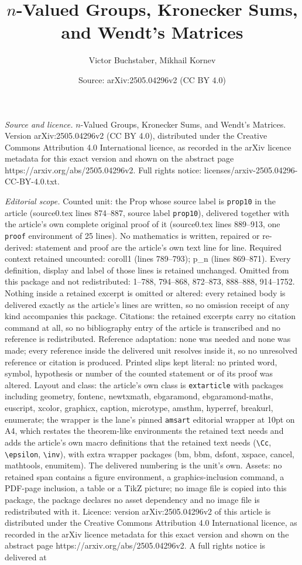 \documentclass[10pt,a4paper]{amsart}
\title[$n$-Valued Groups, Kronecker Sums, and Wendt's Matrices]{$n$-Valued Groups, Kronecker Sums, and Wendt's Matrices}
\author{Victor Buchstaber, Mikhail Kornev}
\date{Source: arXiv:2505.04296v2 (CC BY 4.0)}
\begin{document}
\maketitle

\noindent\emph{Source and licence.} $n$-Valued Groups, Kronecker Sums, and Wendt's Matrices. Version arXiv:2505.04296v2 (CC BY 4.0), distributed under the Creative Commons Attribution 4.0 International licence, as recorded in the arXiv licence metadata for this exact version and shown on the abstract page https://arxiv.org/abs/2505.04296v2. Full rights notice: licenses/arxiv-2505.04296-CC-BY-4.0.txt.\par\smallskip

\noindent\textit{Editorial scope.} Counted unit: the Prop whose source label is \texttt{prop10} in the article (source0.tex lines 874--887, source label \texttt{prop10}), delivered together with the article's own complete original proof of it (source0.tex lines 889--913, one \texttt{proof} environment of 25 lines). No mathematics is written, repaired or re-derived: statement and proof are the article's own text line for line. Required context retained uncounted: coroll1 (lines 789--793); p\_n (lines 869--871). Every definition, display and label of those lines is retained unchanged. Omitted from this package and not redistributed: 1--788, 794--868, 872--873, 888--888, 914--1752. Nothing inside a retained excerpt is omitted or altered: every retained body is delivered exactly as the article's lines are written, so no omission receipt of any kind accompanies this package. Citations: the retained excerpts carry no citation command at all, so no bibliography entry of the article is transcribed and no reference is redistributed. Reference adaptation: none was needed and none was made; every reference inside the delivered unit resolves inside it, so no unresolved reference or citation is produced. Printed slips kept literal: no printed word, symbol, hypothesis or number of the counted statement or of its proof was altered. Layout and class: the article's own class is \texttt{extarticle} with packages including geometry, fontenc, newtxmath, ebgaramond, ebgaramond-maths, euscript, xcolor, graphicx, caption, microtype, amsthm, hyperref, breakurl, enumerate; the wrapper is the lane's pinned \texttt{amsart} editorial wrapper at 10pt on A4, which restates the theorem-like environments the retained text needs and adds the article's own macro definitions that the retained text needs (\texttt{\textbackslash Cc}, \texttt{\textbackslash epsilon}, \texttt{\textbackslash inv}), with extra wrapper packages (bm, bbm, dsfont, xspace, cancel, mathtools, enumitem). The delivered numbering is the unit's own. Assets: no retained span contains a figure environment, a graphics-inclusion command, a PDF-page inclusion, a table or a TikZ picture; no image file is copied into this package, the package declares no asset dependency and no image file is redistributed with it. Licence: version arXiv:2505.04296v2 of this article is distributed under the Creative Commons Attribution 4.0 International licence, as recorded in the arXiv licence metadata for this exact version and shown on the abstract page https://arxiv.org/abs/2505.04296v2. A full rights notice is delivered at 
\end{document}
